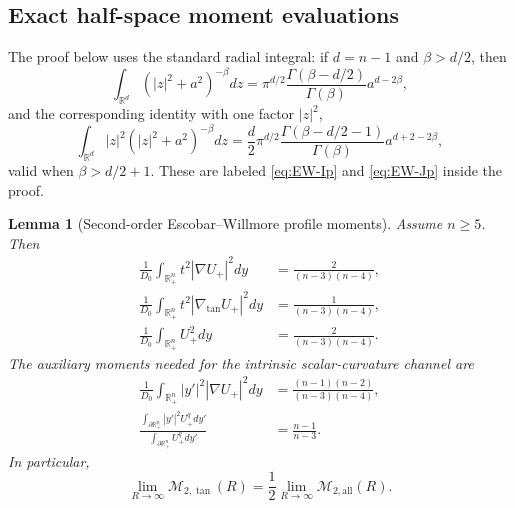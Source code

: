 \documentclass[11pt,reqno,a4paper]{amsart}
\newcommand{\R}{\mathbb{R}}
\numberwithin{equation}{section}
\theoremstyle{plain}
\newtheorem{lemma}[theorem]{Lemma}
\theoremstyle{remark}
\theoremstyle{plain}
\begin{document}
\subsection*{Exact half-space moment evaluations}

The proof below uses the standard radial integral: if $d=n-1$ and $\beta>d/2$, then
\[
\int_{\R^d}(|z|^2+a^2)^{-\beta}dz
=\pi^{d/2}\frac{\Gamma(\beta-d/2)}{\Gamma(\beta)}a^{d-2\beta},
\]
and the corresponding identity with one factor $|z|^2$,
\[
\int_{\R^d}|z|^2(|z|^2+a^2)^{-\beta}dz
=\frac{d}{2}\pi^{d/2}\frac{\Gamma(\beta-d/2-1)}{\Gamma(\beta)}a^{d+2-2\beta},
\]
valid when $\beta>d/2+1$.  These are labeled \eqref{eq:EW-Ip} and
\eqref{eq:EW-Jp} inside the proof.

\begin{lemma}[Second-order Escobar--Willmore profile moments]
\label{lem:EW-moments-explicit-detailed}
Assume $n\ge5$.  Then
\begin{align}
\frac{1}{D_0}\int_{\R^n_+}t^2|\nabla U_+|^2dy
&=\frac{2}{(n-3)(n-4)},
\label{eq:EW-moment-all-detailed}\\
\frac{1}{D_0}\int_{\R^n_+}t^2|\nabla_{\tan}U_+|^2dy
&=\frac{1}{(n-3)(n-4)},
\label{eq:EW-moment-tan-detailed}\\
\frac{1}{D_0}\int_{\R^n_+}U_+^2dy
&=\frac{2}{(n-3)(n-4)}.
\label{eq:EW-moment-U2-detailed}
\end{align}
The auxiliary moments needed for the intrinsic scalar-curvature channel are
\begin{align}
\frac{1}{D_0}\int_{\R^n_+}|y'|^2|\nabla U_+|^2dy
&=\frac{(n-1)(n-2)}{(n-3)(n-4)},
\label{eq:EW-moment-r2-grad-detailed}\\
\frac{\displaystyle\int_{\partial\R^n_+}|y'|^2U_+^qdy'}
{\displaystyle\int_{\partial\R^n_+}U_+^qdy'}
&=\frac{n-1}{n-3}.
\label{eq:EW-moment-boundary-q-r2-detailed}
\end{align}
In particular,
\[
\lim_{R\to\infty}\mathcal M_{2,\tan}(R)
=\frac12\lim_{R\to\infty}\mathcal M_{2,\mathrm{all}}(R).
\]
\end{lemma}
\end{document}
